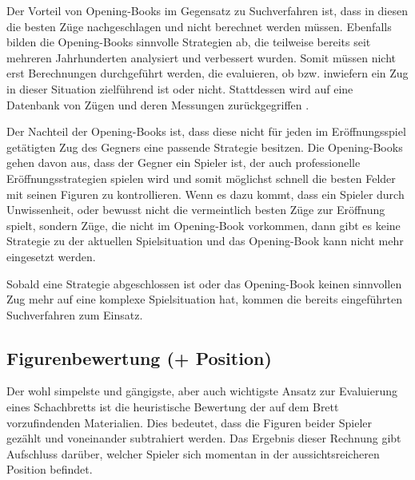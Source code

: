 Der Vorteil von Opening-Books im Gegensatz zu Suchverfahren ist,  dass in diesen die besten Züge nachgeschlagen und nicht berechnet werden müssen. Ebenfalls bilden die Opening-Books sinnvolle Strategien ab, die teilweise bereits seit mehreren Jahrhunderten analysiert und verbessert wurden. Somit müssen nicht erst Berechnungen durchgeführt werden, die evaluieren, ob bzw. inwiefern ein Zug in dieser Situation zielführend ist oder nicht. Stattdessen wird auf eine Datenbank von Zügen und deren Messungen zurückgegriffen \cite{Chess.comTeamInternational2018}.


Der Nachteil der Opening-Books ist, dass diese nicht für jeden im Eröffnungsspiel getätigten Zug des Gegners eine passende Strategie besitzen. Die Opening-Books gehen davon aus, dass der Gegner ein Spieler ist, der auch professionelle Eröffnungsstrategien spielen wird und somit möglichst schnell die besten Felder mit seinen Figuren zu kontrollieren. Wenn es dazu kommt, dass ein Spieler durch Unwissenheit, oder bewusst nicht die vermeintlich besten Züge zur Eröffnung spielt, sondern Züge, die nicht im Opening-Book vorkommen, dann gibt es keine Strategie zu der aktuellen Spielsituation und das Opening-Book kann nicht mehr eingesetzt werden. 

Sobald eine Strategie abgeschlossen ist oder das Opening-Book keinen sinnvollen Zug mehr auf eine komplexe Spielsituation hat, kommen die bereits eingeführten Suchverfahren zum Einsatz.



\subsection{Figurenbewertung (+ Position)}\label{material_evaluation}

Der wohl simpelste und gängigste, aber auch wichtigste Ansatz zur Evaluierung eines Schachbretts ist die heuristische Bewertung der auf dem Brett vorzufindenden Materialien. Dies bedeutet, dass die Figuren beider Spieler gezählt und voneinander subtrahiert werden. Das Ergebnis dieser Rechnung gibt Aufschluss darüber, welcher Spieler sich momentan in der aussichtsreicheren Position befindet.

